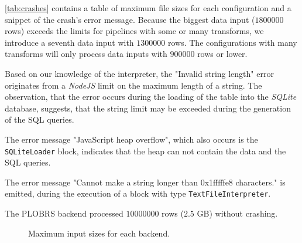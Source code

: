 \autoref{tab:crashes} contains a table of maximum file sizes for each configuration and a snippet of the crash's error message.
Because the biggest data input ($1 800 000$ rows) exceeds the limits for pipelines with some or many transforms, we introduce a seventh data input with $1 300 000$ rows.
The configurations with many transforms will only process data inputs with $900 000$ rows or lower.

Based on our knowledge of the interpreter, the "Invalid string length" error originates from a \emph{NodeJS} limit on the maximum length of a string.
The observation, that the error occurs during the loading of the table into the \emph{SQLite} database, suggests, that the string limit may be exceeded during the generation of the \ac{SQL} queries.

The error message "JavaScript heap overflow", which also occurs is the \Verb|SQLiteLoader| block, indicates that the heap can not contain the data and the \ac{SQL} queries.

The error message "Cannot make a string longer than 0x1fffffe8 characters." is emitted, during the execution of a block with type \Verb|TextFileInterpreter|.

The PLOBRS backend processed $10 000 000$ rows ($2.5$ \ac{GB}) without crashing.

\begin{figure}[h]
	\begin{center}
		\caption{Maximum input sizes for each backend.}
		\label{fig:plot:filesize}
	\end{center}
\end{figure}

